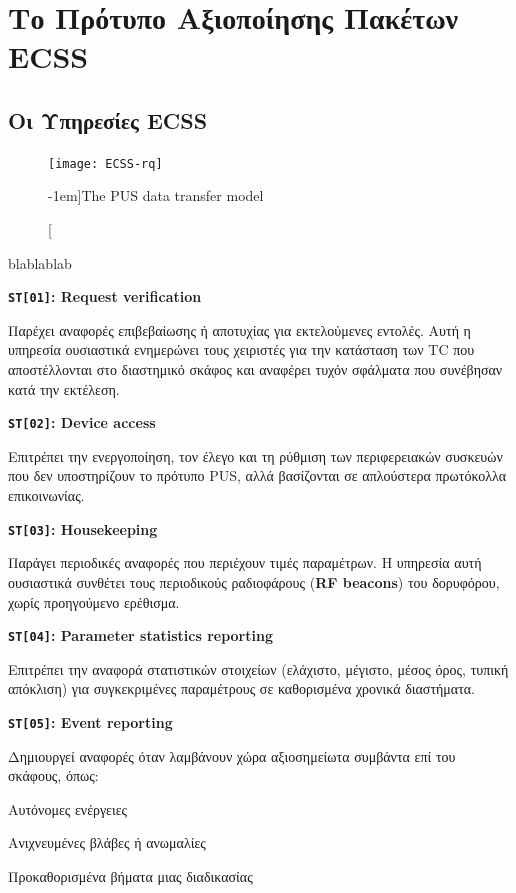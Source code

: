 \documentclass[a4paper,nobib]{tufte-book}
\begin{document}
\section{Το Πρότυπο Αξιοποίησης Πακέτων \acs{ECSS}}

\subsection{Οι Υπηρεσίες \acs{ECSS}}

\begin{figure}
	\texttt{[image: ECSS-rq]}
	\caption[][-1em]{The \ac{PUS} data transfer model}
	\label{fig:pusmodel}
\end{figure}

blablablab \autocite{ECSS-E-ST-70-41C,ECSS-E-70-41A,kaufeler_esa_standard_1994}

\begin{compactitem}
	\item \textbf{\texttt{ST[01]}: Request verification}
	
	Παρέχει αναφορές επιβεβαίωσης ή αποτυχίας για εκτελούμενες εντολές. Αυτή η υπηρεσία ουσιαστικά ενημερώνει τους χειριστές για την κατάσταση των \ac{TC} που αποστέλλονται στο διαστημικό σκάφος και αναφέρει τυχόν σφάλματα που συνέβησαν κατά την εκτέλεση.
	
	\item \textbf{\texttt{ST[02]}: Device access}
	
	Επιτρέπει την ενεργοποίηση, τον έλεγο και τη ρύθμιση των περιφερειακών συσκευών που δεν υποστηρίζουν το πρότυπο \ac{PUS}, αλλά βασίζονται σε απλούστερα πρωτόκολλα επικοινωνίας.
	
	\item \textbf{\texttt{ST[03]}: Housekeeping}
		
		Παράγει περιοδικές αναφορές που περιέχουν τιμές παραμέτρων. Η υπηρεσία αυτή ουσιαστικά συνθέτει τους περιοδικούς ραδιοφάρους (\textbf{\acs{RF} beacons}) του δορυφόρου, χωρίς προηγούμενο ερέθισμα.
		
		\item \textbf{\texttt{ST[04]}: Parameter statistics reporting}
		
		Επιτρέπει την αναφορά στατιστικών στοιχείων (ελάχιστο, μέγιστο, μέσος όρος, τυπική απόκλιση) για συγκεκριμένες παραμέτρους σε καθορισμένα χρονικά διαστήματα.
		
		\item \textbf{\texttt{ST[05]}: Event reporting}
		
		Δημιουργεί αναφορές όταν λαμβάνουν χώρα αξιοσημείωτα συμβάντα επί του σκάφους, όπως:
		\begin{compactitem}
			\item Αυτόνομες ενέργειες
			\item Ανιχνευμένες βλάβες ή ανωμαλίες
			\item Προκαθορισμένα βήματα μιας διαδικασίας
		\end{compactitem}
		

\end{compactitem}
\end{document}
